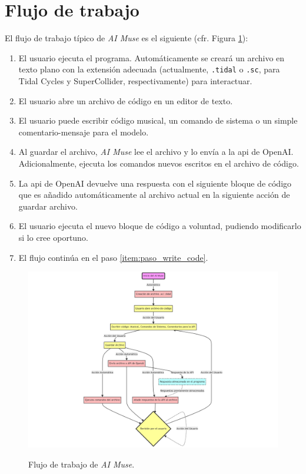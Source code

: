 \section{Flujo de trabajo}

El flujo de trabajo típico de \emph{AI Muse} es el siguiente (cfr. Figura \ref{fig:ai_muse_flow}):

\begin{enumerate}
    \item El usuario ejecuta el programa. Automáticamente se creará un archivo en texto plano con la extensión adecuada (actualmente, \texttt{.tidal} o \texttt{.sc}, para Tidal Cycles y SuperCollider, respectivamente) para interactuar.
    \item El usuario abre un archivo de código en un editor de texto.
    \item \label{item:paso_write_code} El usuario puede escribir código musical, un comando de sistema o un simple comentario-mensaje para el modelo.
    \item Al guardar el archivo, \emph{AI Muse} lee el archivo y lo envía a la \gls{api} de OpenAI. Adicionalmente, ejecuta los comandos nuevos escritos en el archivo de código.
    \item La \gls{api} de OpenAI devuelve una respuesta con el siguiente bloque de código que es añadido automáticamente al archivo actual en la siguiente acción de guardar archivo.
    \item El usuario ejecuta el nuevo bloque de código a voluntad, pudiendo modificarlo si lo cree oportuno.
    \item El flujo continúa en el paso \ref{item:paso_write_code}.
\end{enumerate}


\begin{figure}[H]
    \caption[Flujo de trabajo de \emph{AI Muse}]{Flujo de trabajo de \emph{AI Muse}.}
    \centering
    \includegraphics[width=1\textwidth]{./figuras/flujo_aimuse.png}
    \source{\propio}
    \label{fig:ai_muse_flow}
\end{figure}

